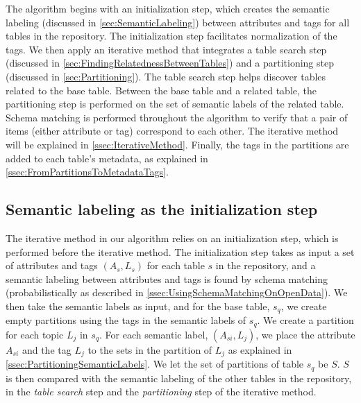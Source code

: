 The algorithm begins with an initialization step, which creates the semantic labeling (discussed in \autoref{sec:SemanticLabeling}) between attributes and tags for all tables in the repository. The initialization step facilitates normalization of the tags. We then apply an iterative method that integrates a table search step (discussed in \autoref{sec:FindingRelatednessBetweenTables}) and a partitioning step (discussed in \autoref{sec:Partitioning}). The table search step helps discover tables related to the base table. Between the base table and a related table, the partitioning step is performed on the set of semantic labels of the related table. Schema matching is performed throughout the algorithm to verify that a pair of items (either attribute or tag) correspond to each other. The iterative method will be explained in \autoref{ssec:IterativeMethod}. Finally, the tags in the partitions are added to each table's metadata, as explained in \autoref{ssec:FromPartitionsToMetadataTags}.

\subsection{Semantic labeling as the initialization step}
\label{ssec:SemanticLabelingAsTheInitializationStep}

The iterative method in our algorithm relies on an initialization step, which is performed before the iterative method. The initialization step takes as input a set of attributes and tags $(A_{s}, L_{s})$ for each table $s$ in the repository, and a semantic labeling between attributes and tags is found by schema matching (probabilistically as described in \autoref{ssec:UsingSchemaMatchingOnOpenData}). We then take the semantic labels as input, and for the base table, $s_q$, we create empty partitions using the tags in the semantic labels of $s_q$. We create a partition for each topic $L_{j}$ in $s_q$. For each semantic label, $(A_{si}, L_{j})$, we place the attribute $A_{si}$ and the tag $L_{j}$ to the sets in the partition of $L_{j}$ as explained in \autoref{ssec:PartitioningSemanticLabels}. We let the set of partitions of table $s_q$ be $S$. $S$ is then compared with the semantic labeling of the other tables in the repository, in the \textit{table search} step and the \textit{partitioning} step of the iterative method.

